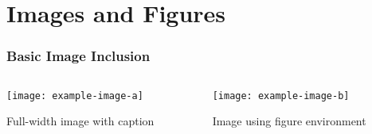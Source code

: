 \documentclass[aspectratio=169,professionalfonts]{beamer}
\begin{document}
\section{Images and Figures}

\begin{frame}
    \frametitle{Basic Image Inclusion}
    
    \begin{columns}[T]
        \begin{column}{0.48\textwidth}
            \texttt{[image: example-image-a]}
            \centerline{\small Full-width image with caption}
            
            \vspace{1em}
            
        \end{column}
        
        \begin{column}{0.48\textwidth}
            \begin{figure}
                \texttt{[image: example-image-b]}
                \caption{Image using figure environment}
            \end{figure}
            
        \end{column}
    \end{columns}
\end{frame}
\end{document}
